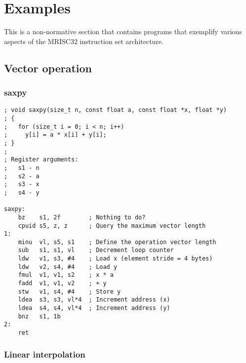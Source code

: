 %

\onecolumn

\chapter{Examples}

This is a non-normative section that contains programs that exemplify various
aspects of the MRISC32 instruction set architecture.

\section{Vector operation}

\subsection{saxpy}

\begin{lstlisting}[style=assembler]
; void saxpy(size_t n, const float a, const float *x, float *y)
; {
;   for (size_t i = 0; i < n; i++)
;     y[i] = a * x[i] + y[i];
; }
;
; Register arguments:
;   s1 - n
;   s2 - a
;   s3 - x
;   s4 - y

saxpy:
    bz    s1, 2f        ; Nothing to do?
    cpuid s5, z, z      ; Query the maximum vector length
1:
    minu  vl, s5, s1    ; Define the operation vector length
    sub   s1, s1, vl    ; Decrement loop counter
    ldw   v1, s3, #4    ; Load x (element stride = 4 bytes)
    ldw   v2, s4, #4    ; Load y
    fmul  v1, v1, s2    ; x * a
    fadd  v1, v1, v2    ; + y
    stw   v1, s4, #4    ; Store y
    ldea  s3, s3, vl*4  ; Increment address (x)
    ldea  s4, s4, vl*4  ; Increment address (y)
    bnz   s1, 1b
2:
    ret
\end{lstlisting}

\subsection{Linear interpolation}

